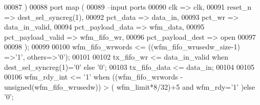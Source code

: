 \begin{DoxyCode}
00087         \textcolor{vhdlchar}{)}
00088   \textcolor{keywordflow}{port} \textcolor{keywordflow}{map} (
00089 \textcolor{keyword}{      --input ports }
00090         clk                 => clk,
00091         reset_n             => dest_sel_syncreg\textcolor{vhdlchar}{(}\textcolor{vhdllogic}{1}\textcolor{vhdlchar}{)},
00092         pct_data                => data_in,
00093         pct_wr              => data_in_valid,
00094         pct_payload_data    => wfm_data,
00095         pct_payload_valid   => wfm_fifo_wr,
00096         pct_payload_dest    => \textcolor{keywordflow}{open}
00097         
00098         \textcolor{vhdlchar}{)};
00099 
00100 \textcolor{vhdlchar}{wfm_fifo_wrwords} \textcolor{vhdlchar}{<=} \textcolor{vhdlchar}{(}\textcolor{vhdlchar}{(}\textcolor{vhdlchar}{wfm_fifo_wrusedw_size}\textcolor{vhdlchar}{-}\textcolor{vhdllogic}{}\textcolor{vhdllogic}{1}\textcolor{vhdlchar}{)} \textcolor{vhdlchar}{=}\textcolor{vhdlchar}{>}\textcolor{vhdlchar}{'}\textcolor{vhdllogic}{}\textcolor{vhdllogic}{1}\textcolor{vhdlchar}{'}\textcolor{vhdlchar}{,} \textcolor{keywordflow}{others}\textcolor{vhdlchar}{=}\textcolor{vhdlchar}{>}\textcolor{vhdlchar}{'}\textcolor{vhdllogic}{}\textcolor{vhdllogic}{0}\textcolor{vhdlchar}{'}\textcolor{vhdlchar}{)};
00101       
00102 \textcolor{vhdlchar}{tx_fifo_wr}      \textcolor{vhdlchar}{<=} \textcolor{vhdlchar}{data_in_valid} \textcolor{keywordflow}{when} \textcolor{vhdlchar}{dest_sel_syncreg}\textcolor{vhdlchar}{(}\textcolor{vhdllogic}{}\textcolor{vhdllogic}{1}\textcolor{vhdlchar}{)}\textcolor{vhdlchar}{=}\textcolor{vhdlchar}{'}\textcolor{vhdllogic}{}\textcolor{vhdllogic}{0}\textcolor{vhdlchar}{'} \textcolor{keywordflow}{else} \textcolor{vhdlchar}{'}\textcolor{vhdllogic}{}\textcolor{vhdllogic}{0}\textcolor{vhdlchar}{'};
00103 \textcolor{vhdlchar}{tx_fifo_data}    \textcolor{vhdlchar}{<=} \textcolor{vhdlchar}{data_in};
00104 
00105 
00106 \textcolor{vhdlchar}{wfm_rdy_int}     \textcolor{vhdlchar}{<=} \textcolor{vhdlchar}{'}\textcolor{vhdllogic}{}\textcolor{vhdllogic}{1}\textcolor{vhdlchar}{'} \textcolor{keywordflow}{when} \textcolor{vhdlchar}{(}\textcolor{vhdlchar}{(}\textcolor{vhdlchar}{wfm_fifo_wrwords} \textcolor{vhdlchar}{-} \textcolor{comment}{unsigned}\textcolor{vhdlchar}{(}\textcolor{vhdlchar}{wfm_fifo_wrusedw}\textcolor{vhdlchar}{)}\textcolor{vhdlchar}{)} \textcolor{vhdlchar}{>} \textcolor{vhdlchar}{(}\textcolor{vhdlchar}{
      wfm_limit}\textcolor{vhdlchar}{*}\textcolor{vhdllogic}{}\textcolor{vhdllogic}{8}\textcolor{vhdlchar}{/}\textcolor{vhdllogic}{}\textcolor{vhdllogic}{32}\textcolor{vhdlchar}{)}\textcolor{vhdlchar}{+}\textcolor{vhdllogic}{}\textcolor{vhdllogic}{5} \textcolor{keywordflow}{and} \textcolor{vhdlchar}{wfm_rdy}\textcolor{vhdlchar}{=}\textcolor{vhdlchar}{'}\textcolor{vhdllogic}{}\textcolor{vhdllogic}{1}\textcolor{vhdlchar}{'} \textcolor{vhdlchar}{)}\textcolor{keywordflow}{else} \textcolor{vhdlchar}{'}\textcolor{vhdllogic}{}\textcolor{vhdllogic}{0}\textcolor{vhdlchar}{'}; 

\end{DoxyCode}
